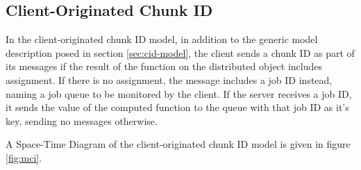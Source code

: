 \documentclass[a4paper,10pt]{article}
\begin{document}
\subsection{Client-Originated Chunk ID}

In the client-originated chunk ID  model, in addition to the generic model
description posed in section \ref{sec:cid-model}, the client sends a chunk ID
as part of its messages if the result of the function on the distributed object
includes assignment.
If there is no assignment, the message includes a job ID instead, naming a job
queue to be monitored by the client.
If the server receives a job ID, it sends the value of the computed function to
the queue with that job ID as it's key, sending no messages otherwise.

A Space-Time Diagram\cite{lamport1978ordering} of the client-originated chunk
ID model is given in figure \ref{fig:mci}.
\end{document}
